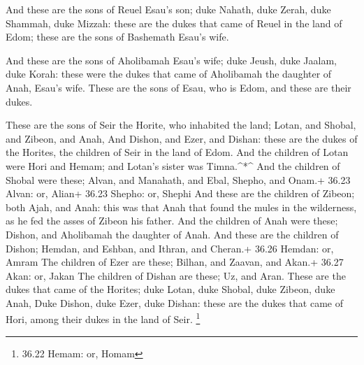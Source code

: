  And these are the sons of Reuel Esau's son; duke Nahath,
duke Zerah, duke Shammah, duke Mizzah: these are the dukes that came of
Reuel in the land of Edom; these are the sons of Bashemath Esau's wife.

 And these are the sons of Aholibamah Esau's wife; duke
Jeush, duke Jaalam, duke Korah: these were the dukes that came of
Aholibamah the daughter of Anah, Esau's wife.  These are
the sons of Esau, who is Edom, and these are their dukes.

 These are the sons of Seir the Horite, who inhabited the
land; Lotan, and Shobal, and Zibeon, and Anah,  And Dishon,
and Ezer, and Dishan: these are the dukes of the Horites, the children
of Seir in the land of Edom.  And the children of Lotan
were Hori and Hemam; and Lotan's sister was Timna.\^{}*\^{}
 And the children of Shobal were these; Alvan, and
Manahath, and Ebal, Shepho, and Onam.+ 36.23 Alvan: or, Alian+ 36.23
Shepho: or, Shephi  And these are the children of Zibeon;
both Ajah, and Anah: this was that Anah that found the mules in the
wilderness, as he fed the asses of Zibeon his father.  And
the children of Anah were these; Dishon, and Aholibamah the daughter of
Anah.  And these are the children of Dishon; Hemdan, and
Eshban, and Ithran, and Cheran.+ 36.26 Hemdan: or, Amram 
The children of Ezer are these; Bilhan, and Zaavan, and Akan.+ 36.27
Akan: or, Jakan  The children of Dishan are these; Uz, and
Aran.  These are the dukes that came of the Horites; duke
Lotan, duke Shobal, duke Zibeon, duke Anah,  Duke Dishon,
duke Ezer, duke Dishan: these are the dukes that came of Hori, among
their dukes in the land of Seir. \footnote{36.22 Hemam: or, Homam}

